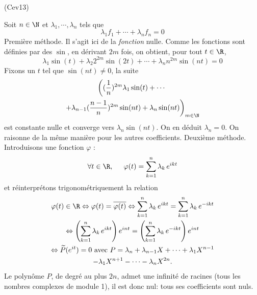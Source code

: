 \begin{tiny}(Cev13)\end{tiny}
Soit $n\in \N$ et $\lambda_1, \cdots, \lambda_n$ tels que
\begin{displaymath}
  \lambda_1 f_1 + \cdots + \lambda_n f_n = 0
\end{displaymath}
Première méthode. Il s'agit ici de la \emph{fonction} nulle. Comme les fonctions sont définies par des $\sin$, en dérivant $2m$ fois, on obtient, pour tout $t\in \R$,
\begin{displaymath}
\lambda_1 \sin(t) + \lambda_2 2^{2m}\sin(2t) + \cdots + \lambda_n n^{2m}\sin(nt) = 0
\end{displaymath}
Fixons un $t$ tel que $\sin(nt)\neq 0$, la suite
\begin{multline*}
  \left((\frac{1}{n})^{2m}\lambda_1 \sin(t) +  \cdots  \right.\\
  \left. +\lambda_{n-1} (\frac{n-1}{n})^{2m}\sin(nt) + \lambda_n\sin(nt) \right)_{m\in \N} 
\end{multline*}
est constante nulle et converge vers $\lambda_n \sin(nt)$. On en déduit $\lambda_n = 0$. On raisonne de la même manière pour les autres coefficients.\newline
Deuxième méthode. Introduisons une fonction $\varphi$ :
\begin{displaymath}
\forall t \in \R,\hspace{0.5cm}  \varphi(t) = \sum_{k=1}^n\lambda_k\,e^{ikt}
\end{displaymath}
et réinterprétons trigonométriquement la relation
\begin{multline*}
\varphi(t)\in \R \Leftrightarrow \varphi(t) = \overline{\varphi(t)}
\Leftrightarrow
\sum_{k=1}^n\lambda_k\,e^{ikt} = \sum_{k=1}^n\lambda_k\,e^{-ikt}\\
\Leftrightarrow
\left( \sum_{k=1}^n\lambda_k\,e^{ikt}\right)e^{int}  = \left( \sum_{k=1}^n\lambda_k\,e^{-ikt}\right) e^{int}\\
\Leftrightarrow
\widetilde{P}(e^{it}) = 0 \text{ avec } 
 P = \lambda_n + \lambda_{n-1}X + \cdots + \lambda_1 X^{n-1}\\
 - \lambda_1 X^{n+1} - \cdots - \lambda_n X^{2n} .
\end{multline*}
Le polynôme $P$, de degré au plus $2n$, admet une infinité de racines (tous les nombres complexes de module 1), il est donc nul: tous ses coefficients sont nuls.
